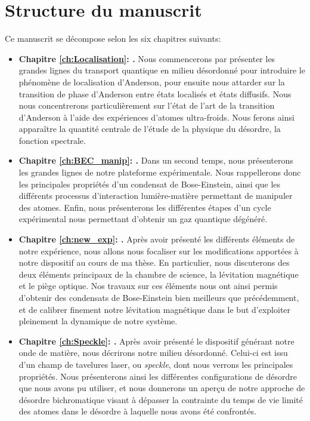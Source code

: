 \section{Structure du manuscrit}
Ce manuscrit se décompose selon les six chapitres suivants:
\begin{itemize}
\item[\textendash] \textbf{Chapitre \ref{ch:Localisation}: {\hypersetup{linkcolor=black}}.} Nous commencerons par présenter les grandes lignes du transport quantique en milieu désordonné pour introduire le phénomène de localisation d'Anderson, pour ensuite nous attarder sur la transition de phase d'Anderson entre états localisés et états diffusifs. Nous nous concentrerons particulièrement sur l'état de l'art de la transition d'Anderson à l'aide des expériences d'atomes ultra-froids.  Nous ferons ainsi apparaître la quantité centrale de l'étude de la physique du désordre, la fonction spectrale. \\

\item[\textendash] \textbf{Chapitre \ref{ch:BEC_manip}: {\hypersetup{linkcolor=black}}.} Dans un second temps, nous présenterons les grandes lignes de notre plateforme expérimentale. Nous rappellerons donc les principales propriétés d'un condensat de Bose-Einstein, ainsi que les différents processus d'interaction lumière-matière permettant de manipuler des atomes. Enfin, nous présenterons les différentes étapes d'un cycle expérimental nous permettant d'obtenir un gaz quantique dégénéré. \\

\item[\textendash] \textbf{Chapitre \ref{ch:new_exp}: {\hypersetup{linkcolor=black}}.} Après avoir présenté les différents éléments de notre expérience, nous allons nous focaliser sur les modifications apportées à notre dispositif au cours de ma thèse. En particulier, nous discuterons des deux éléments principaux de la chambre de science, la lévitation magnétique et le piège optique. Nos travaux sur ces éléments nous ont ainsi permis d'obtenir des condensats de Bose-Einstein bien meilleurs que précédemment, et de calibrer finement notre lévitation magnétique dans le but d'exploiter pleinement la dynamique de notre système. \\

\item[\textendash] \textbf{Chapitre \ref{ch:Speckle}: {\hypersetup{linkcolor=black}}.} Après avoir présenté le dispositif générant notre onde de matière, nous décrirons notre milieu désordonné. Celui-ci est issu d'un champ de tavelures laser, ou \emph{speckle}, dont nous verrons les principales propriétés. Nous présenterons ainsi les différentes configurations de désordre que nous avons pu utiliser, et nous donnerons un aperçu de notre approche de désordre bichromatique visant à dépasser la contrainte du temps de vie limité des atomes dans le désordre à laquelle nous avons été confrontés. \\


\end{itemize}
